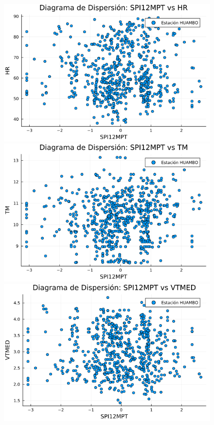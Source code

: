 \begin{figure}[htbp]
\begin{minipage}{0.32\textwidth}
    \centering
    \includegraphics[width=\linewidth]{Capitulos/Scaterplot/HUAMBO_SPI12MPT_vs_HR.png}
\end{minipage}\hfill
\begin{minipage}{0.32\textwidth}
    \centering
    \includegraphics[width=\linewidth]{Capitulos/Scaterplot/HUAMBO_SPI12MPT_vs_TM.png}
\end{minipage}\hfill
\begin{minipage}{0.32\textwidth}
    \centering
    \includegraphics[width=\linewidth]{Capitulos/Scaterplot/HUAMBO_SPI12MPT_vs_VTMED.png}
\end{minipage}


\end{figure}

